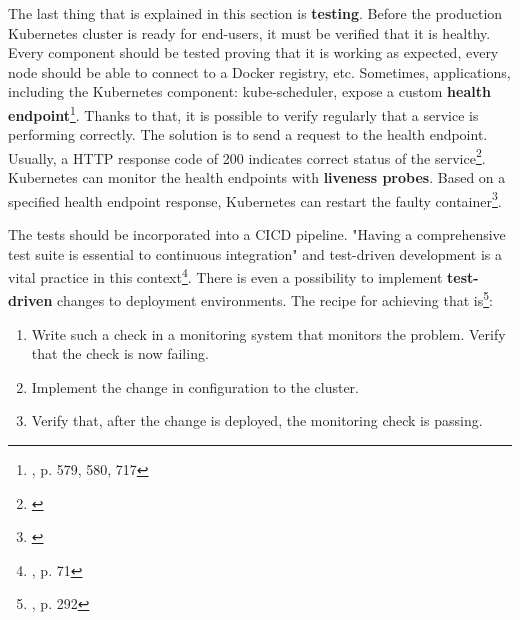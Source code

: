 The last thing that is explained in this section is \textbf{testing}. Before the production Kubernetes cluster is ready for end-users, it must be verified that it is healthy. Every component should be tested proving that it is working as expected, every node should be able to connect to a Docker registry, etc. Sometimes, applications, including the Kubernetes component: kube-scheduler, expose a custom \textbf{health endpoint}\footnote{\cite{book-devops-k8s}, p. 579, 580, 717}. Thanks to that, it is possible to verify regularly that a service is performing correctly. The solution is to send a request to the health endpoint. Usually, a HTTP response code of 200 indicates correct status of the service\footnote{\cite{online-ms-health}}. Kubernetes can monitor the health endpoints with \textbf{liveness probes}. Based on a specified health endpoint response, Kubernetes can restart the faulty container\footnote{\cite{online-k8s-probes}}.

The tests should be incorporated into a CICD pipeline. "Having a comprehensive test suite is essential to continuous integration" and test-driven development is a vital practice in this context\footnote{\cite{book-cicd}, p. 71}. There is even a possibility to implement \textbf{test-driven} changes to deployment environments. The recipe for achieving that is\footnote{\cite{book-cicd}, p. 292}:
\begin{enumerate}
\item Write such a check in a monitoring system that monitors the problem. Verify that the check is now failing.
\item Implement the change in configuration to the cluster.
\item Verify that, after the change is deployed, the monitoring check is passing.
\end{enumerate}

